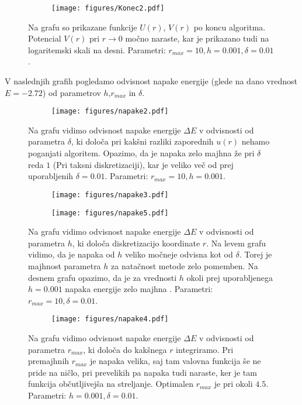 \documentclass{article}
\begin{document}
\begin{figure}[H]
\centering
\begin{subfigure}{.7\textwidth}
\texttt{[image: figures/Konec2.pdf]}
\end{subfigure}
\caption*{Na grafu so prikazane funkcije $U(r)$, $V(r)$ po koncu algoritma. Potencial $V(r)$ pri $r \to 0$ močno naraste, kar je prikazano tudi na logaritemski skali na  desni.  Parametri: $r_{max}=10, h=0.001, \delta=0.01$.}
\end{figure}

V naslednjih grafih pogledamo odvisnost napake energije (glede na dano vrednost $E=-2.72$) od parametrov $h$,$r_{max}$ in $\delta$.

\begin{figure}[H]
\centering
\begin{subfigure}{.7\textwidth}
\texttt{[image: figures/napake2.pdf]}
\end{subfigure}
\caption*{Na grafu vidimo odvisnost napake energije $\Delta E$ v odvisnosti od parametra $\delta$, ki določa pri kakšni razliki zaporednih $u(r)$ nehamo poganjati algoritem. Opazimo, da je napaka zelo majhna že pri $\delta$ reda $1$ (Pri taksni diskretizaciji), kar je veliko več od prej uporabljenih $\delta=0.01$. Parametri: $r_{max}=10, h=0.001$.}
\end{figure}

\begin{figure}[H]
\centering
\begin{subfigure}{.49\textwidth}
\texttt{[image: figures/napake3.pdf]}
\end{subfigure}
\begin{subfigure}{.49\textwidth}
\texttt{[image: figures/napake5.pdf]}
\end{subfigure}
\caption*{Na grafu vidimo odvisnost napake energije $\Delta E$ v odvisnosti od parametra $h$, ki določa diskretizacijo koordinate $r$. Na levem grafu vidimo, da je napaka od $h$ veliko močneje odvisna kot od $\delta$. Torej je majhnost parametra $h$ za natačnost metode zelo pomemben. Na desnem grafu opazimo, da je za vrednosti $h$ okoli prej uporabljenega $h=0.001$ napaka energije zelo majhna . Parametri: $r_{max}=10, \delta=0.01$.}
\end{figure}

\begin{figure}[H]
\centering
\begin{subfigure}{.7\textwidth}
\texttt{[image: figures/napake4.pdf]}
\end{subfigure}
\caption*{Na grafu vidimo odvisnost napake energije $\Delta E$ v odvisnosti od parametra $r_{max}$, ki določa do kakšnega $r$ integriramo. Pri premajhnih $r_{max}$ je napaka velika,  saj tam valovna funkcija še ne pride na ničlo, pri prevelikih pa napaka tudi naraste, ker je tam funkcija občutljivejša na streljanje. Optimalen $r_{max}$ je pri okoli $4.5$. Parametri: $h=0.001, \delta=0.01$.}
\end{figure}
\end{document}
